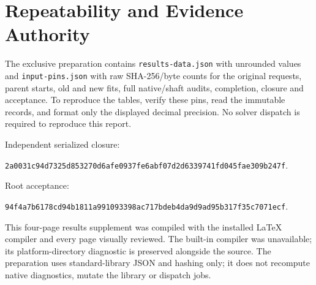 \documentclass[11pt,letterpaper]{article}
\newcommand{\code}[1]{\nolinkurl{#1}}\newcommand{\hash}[1]{{\footnotesize\nolinkurl{#1}}}
\begin{document}
\section{Repeatability and Evidence Authority}
The exclusive preparation contains \code{results-data.json} with unrounded values and \code{input-pins.json} with raw SHA-256/byte counts for the original requests, parent starts, old and new fits, full native/shaft audits, completion, closure and acceptance. To reproduce the tables, verify these pins, read the immutable records, and format only the displayed decimal precision. No solver dispatch is required to reproduce this report.

Independent serialized closure:\par
\hash{2a0031c94d7325d853270d6afe0937fe6abf07d2d6339741fd045fae309b247f}.\par
Root acceptance:\par
\hash{94f4a7b6178cd94b1811a991093398ac717bdeb4da9d9ad95b317f35c7071ecf}.\par
This four-page results supplement was compiled with the installed LaTeX compiler and every page visually reviewed. The built-in compiler was unavailable; its platform-directory diagnostic is preserved alongside the source. The preparation uses standard-library JSON and hashing only; it does not recompute native diagnostics, mutate the library or dispatch jobs.
\end{document}
